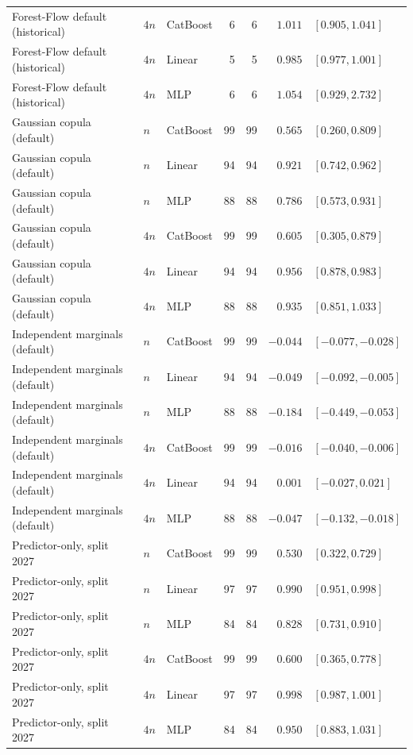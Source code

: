 \begin{longtable}{@{}p{1.6in}llrrrl@{}}
Forest-Flow default (historical) & $4n$ & CatBoost & 6 & 6 & $1.011$ & $[0.905, 1.041]$ \\
Forest-Flow default (historical) & $4n$ & Linear & 5 & 5 & $0.985$ & $[0.977, 1.001]$ \\
Forest-Flow default (historical) & $4n$ & MLP & 6 & 6 & $1.054$ & $[0.929, 2.732]$ \\
Gaussian copula (default) & $n$ & CatBoost & 99 & 99 & $0.565$ & $[0.260, 0.809]$ \\
Gaussian copula (default) & $n$ & Linear & 94 & 94 & $0.921$ & $[0.742, 0.962]$ \\
Gaussian copula (default) & $n$ & MLP & 88 & 88 & $0.786$ & $[0.573, 0.931]$ \\
Gaussian copula (default) & $4n$ & CatBoost & 99 & 99 & $0.605$ & $[0.305, 0.879]$ \\
Gaussian copula (default) & $4n$ & Linear & 94 & 94 & $0.956$ & $[0.878, 0.983]$ \\
Gaussian copula (default) & $4n$ & MLP & 88 & 88 & $0.935$ & $[0.851, 1.033]$ \\
Independent marginals (default) & $n$ & CatBoost & 99 & 99 & $-0.044$ & $[-0.077, -0.028]$ \\
Independent marginals (default) & $n$ & Linear & 94 & 94 & $-0.049$ & $[-0.092, -0.005]$ \\
Independent marginals (default) & $n$ & MLP & 88 & 88 & $-0.184$ & $[-0.449, -0.053]$ \\
Independent marginals (default) & $4n$ & CatBoost & 99 & 99 & $-0.016$ & $[-0.040, -0.006]$ \\
Independent marginals (default) & $4n$ & Linear & 94 & 94 & $0.001$ & $[-0.027, 0.021]$ \\
Independent marginals (default) & $4n$ & MLP & 88 & 88 & $-0.047$ & $[-0.132, -0.018]$ \\
Predictor-only, split 2027 & $n$ & CatBoost & 99 & 99 & $0.530$ & $[0.322, 0.729]$ \\
Predictor-only, split 2027 & $n$ & Linear & 97 & 97 & $0.990$ & $[0.951, 0.998]$ \\
Predictor-only, split 2027 & $n$ & MLP & 84 & 84 & $0.828$ & $[0.731, 0.910]$ \\
Predictor-only, split 2027 & $4n$ & CatBoost & 99 & 99 & $0.600$ & $[0.365, 0.778]$ \\
Predictor-only, split 2027 & $4n$ & Linear & 97 & 97 & $0.998$ & $[0.987, 1.001]$ \\
Predictor-only, split 2027 & $4n$ & MLP & 84 & 84 & $0.950$ & $[0.883, 1.031]$ \\

\end{longtable}
